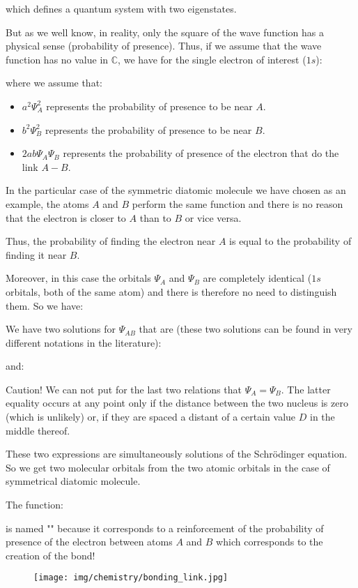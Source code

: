 	which defines a quantum system with two eigenstates.

	But as we well know, in reality, only the square of the wave function has a physical sense (probability of presence). Thus, if we assume that the wave function has no value in $\mathbb{C}$, we have for the single electron of interest ($1s$):
	
	where we assume that:
	\begin{itemize}
		\item $a^2\Psi_A^2$ represents the probability of presence to be near $A$.
		\item $b^2\Psi_B^2$ represents the probability of presence to be near $B$.
		\item $2ab\Psi_A\Psi_B$ represents the probability of presence of the electron that do the link $A-B$.
	\end{itemize}
	In the particular case of the symmetric diatomic molecule we have chosen as an example, the atoms $A$ and $B$ perform the same function and there is no reason that the electron is closer to $A$ than to $B$ or vice versa.

	Thus, the probability of finding the electron near $A$ is equal to the probability of finding it near $B$.
	
	Moreover, in this case the orbitals $\Psi_A$ and $\Psi_B$ are completely identical ($1s$ orbitals, both of the same atom) and there is therefore no need to distinguish them. So we have:
	
	We have two solutions for $\Psi_{AB}$ that are (these two solutions can be found in very different notations in the literature):
	
	and:
	 
	
	\begin{tcolorbox}[colback=red!5,borderline={1mm}{2mm}{red!5},arc=0mm,boxrule=0pt]
	\bcbombe Caution! We can not put for the last two relations that $\Psi_A=\Psi_B$. The latter equality occurs at any point only if the distance between the two nucleus is zero (which is unlikely) or, if they are spaced a distant of a certain value $D$ in the middle thereof.
	\end{tcolorbox}
	
	These two expressions are simultaneously solutions of the Schrödinger equation. So we get two molecular orbitals from the two atomic orbitals in the case of symmetrical diatomic molecule.
	
	The function:
	
	is named "" because it corresponds to a reinforcement of the probability of presence of the electron between atoms $A$ and $B$ which corresponds to the creation of the bond!
	\begin{figure}[H]
		\begin{center}
		\texttt{[image: img/chemistry/bonding\_link.jpg]}
		\end{center}	
	\end{figure}
		
